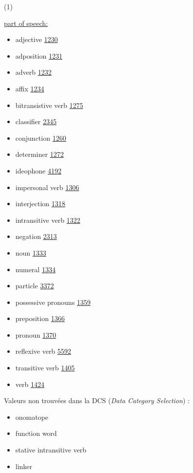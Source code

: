 \documentclass[a4paper,12pt]{article}
\begin{document}
\hypertarget{1}{(1)}
\hyperlink{pos}{part of speech:}
\begin{itemize}
\item adjective \href{http://www.isocat.org/datcat/DC-1230}{1230}
\item adposition \href{http://www.isocat.org/datcat/DC-1231}{1231}
\item adverb \href{http://www.isocat.org/datcat/DC-1232}{1232}
\item affix \href{http://www.isocat.org/datcat/DC-1234}{1234}
\item bitransistive verb \href{http://www.isocat.org/datcat/DC-1275}{1275}
\item classifier \href{http://www.isocat.org/datcat/DC-2345}{2345}
\item conjunction \href{http://www.isocat.org/datcat/DC-1260}{1260}
\item determiner \href{http://www.isocat.org/datcat/DC-1272}{1272}
\item ideophone \href{http://www.isocat.org/datcat/DC-4192}{4192}
\item impersonal verb \href{http://www.isocat.org/datcat/DC-1306}{1306}
\item interjection \href{http://www.isocat.org/datcat/DC-1318}{1318}
\item intransitive verb \href{http://www.isocat.org/datcat/DC-1322}{1322}
\item negation \href{http://www.isocat.org/datcat/DC-2313}{2313}
\item noun \href{http://www.isocat.org/datcat/DC-1333}{1333}
\item numeral \href{http://www.isocat.org/datcat/DC-1334}{1334}
\item particle \href{http://www.isocat.org/datcat/DC-3372}{3372}
\item possessive pronouns \href{http://www.isocat.org/datcat/DC-1359}{1359}
\item preposition \href{http://www.isocat.org/datcat/DC-1366}{1366}
\item pronoun \href{http://www.isocat.org/datcat/DC-1370}{1370}
\item reflexive verb \href{http://www.isocat.org/datcat/DC-5592}{5592}
\item transitive verb \href{http://www.isocat.org/datcat/DC-1405}{1405}
\item verb \href{http://www.isocat.org/datcat/DC-1424}{1424}
\end{itemize}
Valeurs non trouv\'ees dans la DCS (\textit{Data Category Selection}) :
\begin{itemize}
\item onomatope
\item function word
\item stative intransitive verb
\item linker
\end{itemize}
\end{document}

